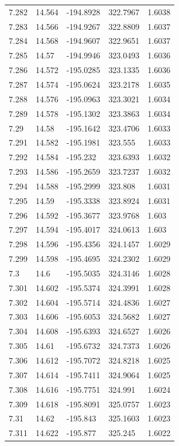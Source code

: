 \begin{tabular}{lllll}
7.282 & 14.564 & -194.8928 & 322.7967 & 1.6038 \\
7.283 & 14.566 & -194.9267 & 322.8809 & 1.6037 \\
7.284 & 14.568 & -194.9607 & 322.9651 & 1.6037 \\
7.285 & 14.57 & -194.9946 & 323.0493 & 1.6036 \\
7.286 & 14.572 & -195.0285 & 323.1335 & 1.6036 \\
7.287 & 14.574 & -195.0624 & 323.2178 & 1.6035 \\
7.288 & 14.576 & -195.0963 & 323.3021 & 1.6034 \\
7.289 & 14.578 & -195.1302 & 323.3863 & 1.6034 \\
7.29 & 14.58 & -195.1642 & 323.4706 & 1.6033 \\
7.291 & 14.582 & -195.1981 & 323.555 & 1.6033 \\
7.292 & 14.584 & -195.232 & 323.6393 & 1.6032 \\
7.293 & 14.586 & -195.2659 & 323.7237 & 1.6032 \\
7.294 & 14.588 & -195.2999 & 323.808 & 1.6031 \\
7.295 & 14.59 & -195.3338 & 323.8924 & 1.6031 \\
7.296 & 14.592 & -195.3677 & 323.9768 & 1.603 \\
7.297 & 14.594 & -195.4017 & 324.0613 & 1.603 \\
7.298 & 14.596 & -195.4356 & 324.1457 & 1.6029 \\
7.299 & 14.598 & -195.4695 & 324.2302 & 1.6029 \\
7.3 & 14.6 & -195.5035 & 324.3146 & 1.6028 \\
7.301 & 14.602 & -195.5374 & 324.3991 & 1.6028 \\
7.302 & 14.604 & -195.5714 & 324.4836 & 1.6027 \\
7.303 & 14.606 & -195.6053 & 324.5682 & 1.6027 \\
7.304 & 14.608 & -195.6393 & 324.6527 & 1.6026 \\
7.305 & 14.61 & -195.6732 & 324.7373 & 1.6026 \\
7.306 & 14.612 & -195.7072 & 324.8218 & 1.6025 \\
7.307 & 14.614 & -195.7411 & 324.9064 & 1.6025 \\
7.308 & 14.616 & -195.7751 & 324.991 & 1.6024 \\
7.309 & 14.618 & -195.8091 & 325.0757 & 1.6023 \\
7.31 & 14.62 & -195.843 & 325.1603 & 1.6023 \\
7.311 & 14.622 & -195.877 & 325.245 & 1.6022 \\

\end{tabular}
